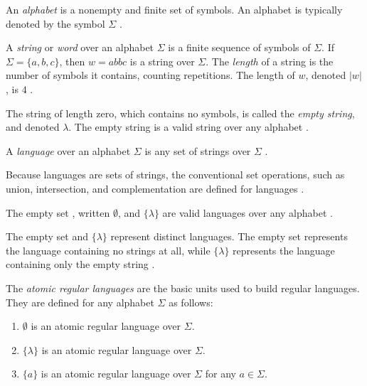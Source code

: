 \documentclass{bcthesis}
\renewcommand{\meo}[1]{}
\newcommand{\footcite}[2]{\xspace\cite[pg.~{#2}]{#1}\xspace}
\begin{document}
		\begin{definition}[Alphabet]
			An \textit{alphabet} is a nonempty and finite set of symbols.
			An alphabet is typically denoted by the symbol $\Sigma$ \footcite{salomaa}{1}.
		\end{definition}

		\begin{definition}[String]
			A \textit{string} or \textit{word} over an alphabet $\Sigma$ is a finite sequence of symbols of $\Sigma$.
			If $\Sigma = \{ a, b ,c \}$, then $w = abbc$ is a string over $\Sigma$.
			The \textit{length} of a string is the number of symbols it contains, counting repetitions.
			The length of $w$, denoted $|w|$, is $4$ \footcite{hopcroft}{1}.

			The string of length zero, which contains no symbols, is called the \textit{empty string}, and denoted $\lambda$.
			The empty string is a valid string over any alphabet \footcite{salomaa}{1}.
		\end{definition}

		\begin{definition}[Language]
			A \textit{language} over an alphabet $\Sigma$ is any set of strings over $\Sigma$ \footcite{hopcroft}{2}.

			Because languages are sets of strings, the conventional set operations, such as union, intersection, and complementation are defined for languages \footcite{hopcroft}{5}.

			The empty set , written $\emptyset$, and $\{ \lambda \}$ are valid languages over any alphabet \footcite{hopcroft}{2}.

		\end{definition}

		\begin{remark}
			The empty set and $\{ \lambda \}$ represent distinct languages. 
			The empty set represents the language containing no strings at all, while $\{ \lambda \}$ represents the language containing only the empty string \footcite{hopcroft}{2}.
		\end{remark}


\label{ch:regular_expressions}
	
	\meo{Add an introduction.}

	\begin{definition}
		The \textit{atomic regular languages} are the basic units used to build regular languages.
		They are defined for any alphabet $\Sigma$ as follows:

		\begin{enumerate}[label=(\roman*), itemsep = -0.3 ex, nolistsep]
			\item $\emptyset$ is an atomic regular language over $\Sigma$.
			\item $\{ \lambda \}$ is an atomic regular language over $\Sigma$.
			\item $\{ a \}$ is an atomic regular language over $\Sigma$ for any $a \in \Sigma$.
		\end{enumerate}
		\footcite{hopcroft}{28}~ \meo{todo: something about this citation.}
	\end{definition}
\end{document}
